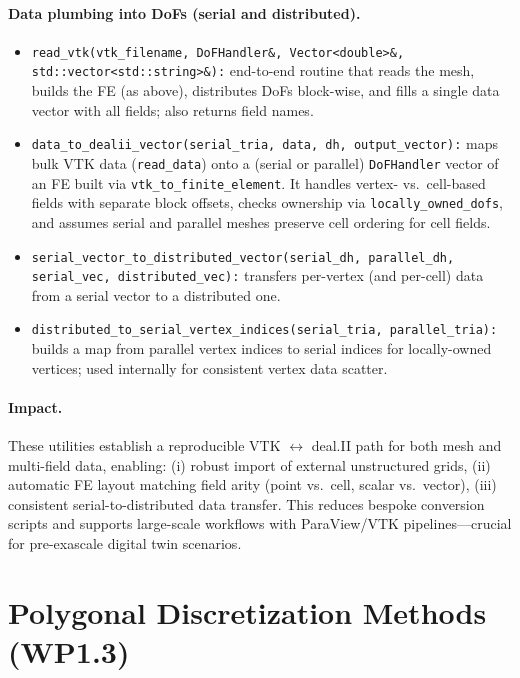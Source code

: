 \documentclass[a4paper,12pt]{article}
\begin{document}
\paragraph{Data plumbing into DoFs (serial and distributed).}
\begin{itemize}
  \item {\footnotesize \texttt{read\_vtk(vtk\_filename, DoFHandler\&, Vector<double>\&, std::vector<std::string>\&):}}
        end-to-end routine that reads the mesh, builds the FE (as above),
        distributes DoFs block-wise, and fills a single data vector with all
        fields; also returns field names.
  \item \texttt{data\_to\_dealii\_vector(serial\_tria, data, dh, output\_vector):}
        maps bulk VTK data (\texttt{read\_data}) onto a (serial or parallel)
        \texttt{DoFHandler} vector of an FE built via \texttt{vtk\_to\_finite\_element}.
        It handles vertex- vs.\ cell-based fields with separate block offsets,
        checks ownership via \texttt{locally\_owned\_dofs}, and assumes serial
        and parallel meshes preserve cell ordering for cell fields.
  \item \texttt{serial\_vector\_to\_distributed\_vector(serial\_dh, parallel\_dh, serial\_vec, distributed\_vec):}
        transfers per-vertex (and per-cell) data from a serial vector to a
        distributed one.
  \item \texttt{distributed\_to\_serial\_vertex\_indices(serial\_tria, parallel\_tria):}
        builds a map from parallel vertex indices to serial indices for
        locally-owned vertices; used internally for consistent vertex data scatter.
\end{itemize}

\paragraph{Impact.} These utilities establish a reproducible VTK $\leftrightarrow$
deal.II path for both mesh and multi-field data, enabling:
(i) robust import of external unstructured grids,
(ii) automatic FE layout matching field arity (point vs.\ cell, scalar vs.\ vector),
(iii) consistent serial-to-distributed data transfer.
This reduces bespoke conversion scripts and supports large-scale workflows with
ParaView/VTK pipelines—crucial for pre-exascale digital twin scenarios.


\section{Polygonal Discretization Methods (WP1.3)}
\end{document}
